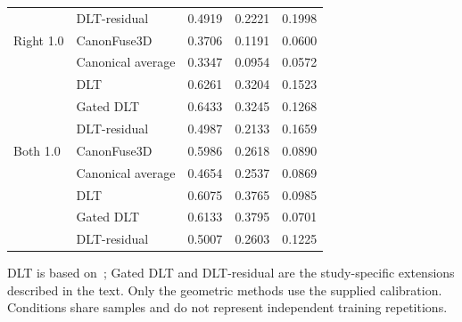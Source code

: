 \begin{table}[htbp]
\begin{tabular}{llrrr}
 & DLT-residual & 0.4919 & 0.2221 & 0.1998 \\
Right 1.0 & CanonFuse3D & 0.3706 & 0.1191 & 0.0600 \\
 & Canonical average & 0.3347 & 0.0954 & 0.0572 \\
 & DLT & 0.6261 & 0.3204 & 0.1523 \\
 & Gated DLT & 0.6433 & 0.3245 & 0.1268 \\
 & DLT-residual & 0.4987 & 0.2133 & 0.1659 \\
Both 1.0 & CanonFuse3D & 0.5986 & 0.2618 & 0.0890 \\
 & Canonical average & 0.4654 & 0.2537 & 0.0869 \\
 & DLT & 0.6075 & 0.3765 & 0.0985 \\
 & Gated DLT & 0.6133 & 0.3795 & 0.0701 \\
 & DLT-residual & 0.5007 & 0.2603 & 0.1225 \\
\bottomrule
\end{tabular}
\par\smallskip\begin{minipage}{\linewidth}\footnotesize DLT is based on~\cite{hartley2004multiple}; Gated DLT and DLT-residual are the study-specific extensions described in the text. Only the geometric methods use the supplied calibration. Conditions share samples and do not represent independent training repetitions.\end{minipage}
\end{table}

